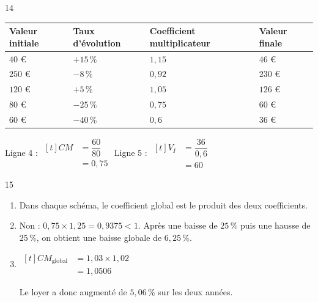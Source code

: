 \documentclass[10pt,a4paper]{article}
\begin{document}
\begin{corr}{14}
\begin{center}
\renewcommand{\arraystretch}{1.5}
\begin{tabular}{|C{0.18\textwidth}|C{0.18\textwidth}|C{0.18\textwidth}|C{0.18\textwidth}|}
    \hline
    \textbf{Valeur initiale} & \textbf{Taux d'évolution} & \textbf{Coefficient multiplicateur} & \textbf{Valeur finale} \\ \hline
    \(40\) \euro & \(+15\,\%\) & \(1,15\) & \(46\) \euro \\ \hline
    \(250\) \euro & \(-8\,\%\) & \(0,92\) & \(230\) \euro \\ \hline
    \(120\) \euro & \(+5\,\%\) & \(1,05\) & \(126\) \euro \\ \hline
    \(80\) \euro & \(-25\,\%\) & \(0,75\) & \(60\) \euro \\ \hline
    \(60\) \euro & \(-40\,\%\) & \(0,6\) & \(36\) \euro \\ \hline
\end{tabular}
\end{center}
Ligne 4 : \(\begin{aligned}[t] CM&=\dfrac{60}{80}\\ &=0,75\end{aligned}\) \qquad Ligne 5 : \(\begin{aligned}[t] V_I&=\dfrac{36}{0,6}\\ &=60\end{aligned}\)
\end{corr}

\begin{corr}{15}
\begin{enumerate}[leftmargin=*]
    \item Dans chaque schéma, le coefficient global est le produit des deux coefficients.


    \item Non : \(0,75\times 1,25=0,9375<1\). Après une baisse de \(25\,\%\) puis une hausse de \(25\,\%\), on obtient une baisse globale de \(6,25\,\%\).
    \item \(\begin{aligned}[t] CM_{\text{global}}&=1,03\times 1,02\\ &=1,0506\end{aligned}\)

    Le loyer a donc augmenté de \(5,06\,\%\) sur les deux années.
\end{enumerate}
\end{corr}
\end{document}
